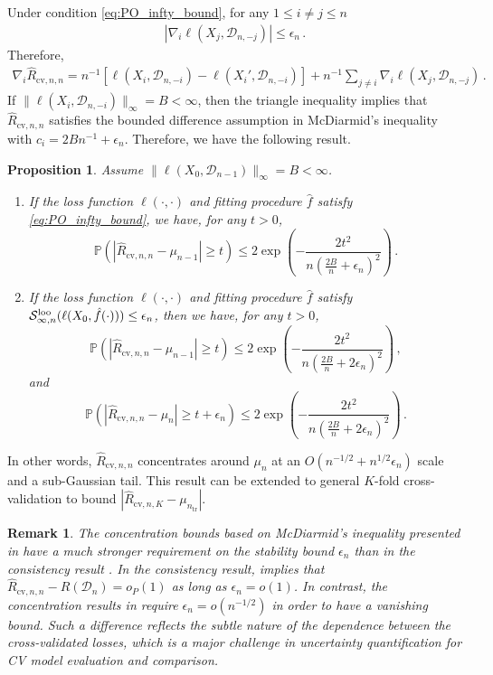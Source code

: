 \documentclass[11pt]{article}
\theoremstyle{plain}
\newtheorem{proposition}[theorem]{Proposition}
\newtheorem{remark}[theorem]{Remark}
\newcommand{\cv}{{\mathrm{cv}}}
\newcommand{\tr}{{\mathrm{tr}}}
\newcommand{\D}{{\mathcal{D}}}
\renewcommand{\S}{{\mathcal{S}}}
\begin{document}
Under condition \eqref{eq:PO_infty_bound}, for any $1\le i\neq j\le n$
\begin{align*}
    |\nabla_i\ell(X_j,\D_{n,-j})| \le \epsilon_n\,. 
\end{align*}
Therefore,
\begin{align*}
\nabla_i \hat R_{\cv,n,n} = n^{-1}\left[\ell(X_i,\D_{n,-i})-\ell(X_i',\D_{n,-i})\right]
+n^{-1}\sum_{j\neq i} \nabla_i \ell(X_j,\D_{n,-j})\,.
\end{align*}
If $\|\ell(X_i,\mathcal D_{n,-i})\|_\infty=B<\infty$, then
the triangle inequality implies that $\hat R_{\cv,n,n}$ satisfies the bounded difference assumption in McDiarmid's inequality with $c_i=2Bn^{-1}+\epsilon_n$. Therefore, we have the following result.
\begin{proposition}\label{pro:bousquest_concentration}
Assume $\|\ell(X_0,\D_{n-1})\|_\infty=B<\infty$.
\begin{enumerate}
    \item If the loss function $\ell(\cdot,\cdot)$ and fitting procedure $\hat f$  satisfy \eqref{eq:PO_infty_bound}, we have, for any $t>0$,
    $$
    \mathbb P\left(|\hat R_{\cv,n,n}-\mu_{n-1}|\ge t\right)\le 2\exp\left(-\frac{2t^2}{n\left(\frac{2B}{n}+\epsilon_n\right)^2}\right)\,.
    $$
    \item If the loss function $\ell(\cdot,\cdot)$ and fitting procedure $\hat f$  satisfy $\S_{\infty,n}^{\rm loo}(\ell(X_0,\hat f(\cdot)))\le \epsilon_n$, then we have, for any $t>0$,
    $$
    \mathbb P\left(|\hat R_{\cv,n,n}-\mu_{n-1}|\ge t\right)\le 2\exp\left(-\frac{2t^2}{n\left(\frac{2B}{n}+2\epsilon_n\right)^2}\right)\,,
    $$
    and
    $$
    \mathbb P\left(|\hat R_{\cv,n,n}-\mu_{n}|\ge t+\epsilon_n\right)\le 2\exp\left(-\frac{2t^2}{n\left(\frac{2B}{n}+2\epsilon_n\right)^2}\right)\,.
    $$
\end{enumerate}
\end{proposition}

In other words, $\hat R_{\cv,n,n}$ concentrates around $\mu_n$ at an $O(n^{-1/2}+n^{1/2}\epsilon_n)$ scale and a sub-Gaussian tail.  This result can be extended to general $K$-fold cross-validation to bound $|\hat R_{\cv,n,K}-\mu_{n_\tr}|$.

\begin{remark}\label{rem:2.4-epsilon-o(sqrt(n))}
The concentration bounds based on McDiarmid's inequality presented in  have a much stronger requirement on the stability bound $\epsilon_n$ than in the consistency result .
In the consistency result,  implies that $\hat R_{\cv,n,n}-R(\D_n)=o_P(1)$ as long as $\epsilon_n=o(1)$.
In contrast, the concentration results in  require
$\epsilon_n=o(n^{-1/2})$ in order to have a vanishing bound.  Such a difference reflects the subtle nature of the dependence between the cross-validated losses, which is a major challenge in uncertainty quantification for CV model evaluation and comparison.
\end{remark} 
\end{document}
